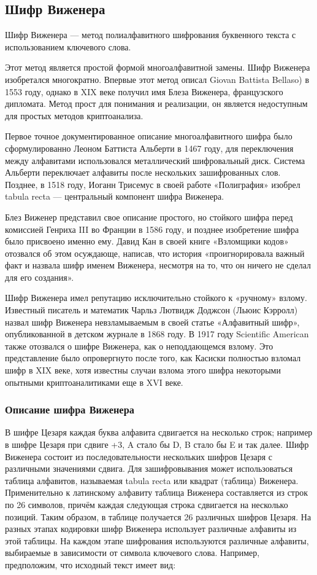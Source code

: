 \subsection{Шифр Виженера}

Шифр Виженера --- метод полиалфавитного 
шифрования буквенного текста с использованием ключевого слова.

Этот метод является простой формой многоалфавитной замены. Шифр 
Виженера изобретался многократно. Впервые этот метод описал
Giovan Battista Bellaso) в 1553 году, однако в XIX веке 
получил имя Блеза Виженера, французского дипломата. Метод прост 
для понимания и реализации, он является недоступным для простых 
методов криптоанализа.

Первое точное документированное описание многоалфавитного шифра 
было сформулированно Леоном Баттиста Альберти в 1467 году, для 
переключения между алфавитами использовался металлический шифровальный 
диск. Система Альберти переключает алфавиты после нескольких 
зашифрованных слов. Позднее, в 1518 году, Иоганн Трисемус в своей 
работе «Полиграфия» изобрел tabula recta — центральный компонент 
шифра Виженера.

Блез Виженер представил свое описание простого, но стойкого шифра 
перед комиссией Генриха III во Франции в 1586 году, и позднее 
изобретение шифра было присвоено именно ему. Давид Кан в своей 
книге «Взломщики кодов» отозвался об этом осуждающе, написав, 
что история «проигнорировала важный факт и назвала шифр именем 
Виженера, несмотря на то, что он ничего не сделал для его создания».

Шифр Виженера имел репутацию исключительно стойкого к «ручному»
взлому. Известный писатель и математик Чарльз Лютвидж Доджсон 
(Льюис Кэрролл) назвал шифр Виженера невзламываемым в своей статье 
«Алфавитный шифр», опубликованной в 
детском журнале в 1868 году. В 1917 году Scientific American 
также отозвался о шифре Виженера, как о неподдающемся взлому. 
Это представление было опровергнуто после того, как Касиски полностью 
взломал шифр в XIX веке, хотя известны случаи взлома этого шифра 
некоторыми опытными криптоаналитиками еще в XVI веке.

\subsubsection{Описание шифра Виженера}

В шифре Цезаря каждая буква алфавита сдвигается на несколько 
строк; например в шифре Цезаря при сдвиге +3, A стало бы D, B 
стало бы E и так далее. Шифр Виженера состоит из последовательности 
нескольких шифров Цезаря с различными значениями сдвига. Для 
зашифровывания может использоваться таблица алфавитов, называемая 
tabula recta или квадрат (таблица) Виженера. Применительно к 
латинскому алфавиту таблица Виженера составляется из строк по 
26 символов, причём каждая следующая строка сдвигается на несколько 
позиций. Таким образом, в таблице получается 26 различных шифров 
Цезаря. На разных этапах кодировки шифр Виженера использует различные 
алфавиты из этой таблицы. На каждом этапе шифрования используются 
различные алфавиты, выбираемые в зависимости от символа ключевого 
слова. Например, предположим, что исходный текст имеет вид:

